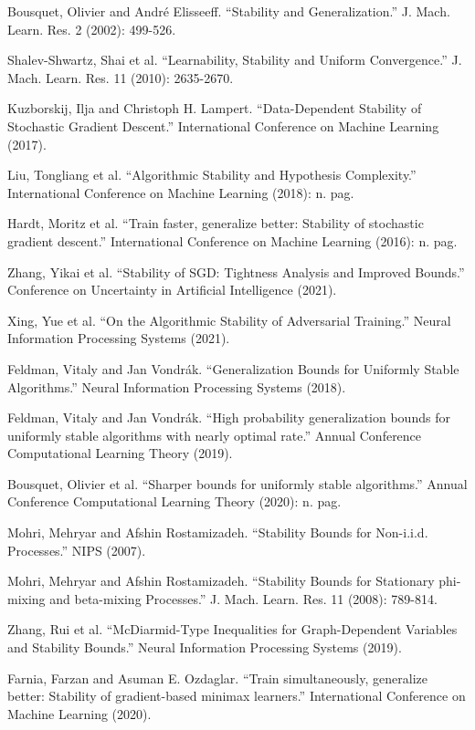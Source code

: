 \documentclass[preprint,12pt,authoryear]{elsarticle}
\begin{document}
\begin{thebibliography}{00}
Bousquet, Olivier and André Elisseeff. “Stability and Generalization.” J. Mach. Learn. Res. 2 (2002): 499-526.

Shalev-Shwartz, Shai et al. “Learnability, Stability and Uniform Convergence.” J. Mach. Learn. Res. 11 (2010): 2635-2670.

Kuzborskij, Ilja and Christoph H. Lampert. “Data-Dependent Stability of Stochastic Gradient Descent.” International Conference on Machine Learning (2017).

Liu, Tongliang et al. “Algorithmic Stability and Hypothesis Complexity.” International Conference on Machine Learning (2018): n. pag.

Hardt, Moritz et al. “Train faster, generalize better: Stability of stochastic gradient descent.”  International Conference on Machine Learning (2016): n. pag.

Zhang, Yikai et al. “Stability of SGD: Tightness Analysis and Improved Bounds.” Conference on Uncertainty in Artificial Intelligence (2021).

Xing, Yue et al. “On the Algorithmic Stability of Adversarial Training.” Neural Information Processing Systems (2021).

Feldman, Vitaly and Jan Vondrák. “Generalization Bounds for Uniformly Stable Algorithms.” Neural Information Processing Systems (2018).

Feldman, Vitaly and Jan Vondrák. “High probability generalization bounds for uniformly stable algorithms with nearly optimal rate.” Annual Conference Computational Learning Theory (2019).

Bousquet, Olivier et al. “Sharper bounds for uniformly stable algorithms.” Annual Conference Computational Learning Theory (2020): n. pag.

Mohri, Mehryar and Afshin Rostamizadeh. “Stability Bounds for Non-i.i.d. Processes.” NIPS (2007).

Mohri, Mehryar and Afshin Rostamizadeh. “Stability Bounds for Stationary phi-mixing and beta-mixing Processes.” J. Mach. Learn. Res. 11 (2008): 789-814.

Zhang, Rui et al. “McDiarmid-Type Inequalities for Graph-Dependent Variables and Stability Bounds.” Neural Information Processing Systems (2019).

Farnia, Farzan and Asuman E. Ozdaglar. “Train simultaneously, generalize better: Stability of gradient-based minimax learners.” International Conference on Machine Learning (2020).


\end{thebibliography}
\end{document}

